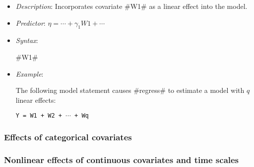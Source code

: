 \begin{itemize}
\item[] {\em Description}: Incorporates covariate #W1# as a linear effect into the model.
\item[] {\em Predictor}: $\eta =  \cdots + \gamma_1 W1 + \cdots$
\item[] {\em Syntax}:

#W1#
\item[] {\em Example}:

The following model statement causes #regress# to estimate a model
with $q$ linear effects:

\texttt{Y = W1 + W2 + $\cdots$ + Wq}
\end{itemize}

\subsubsection*{Effects of categorical covariates}



\subsubsection*{Nonlinear effects of continuous covariates and time
scales}

